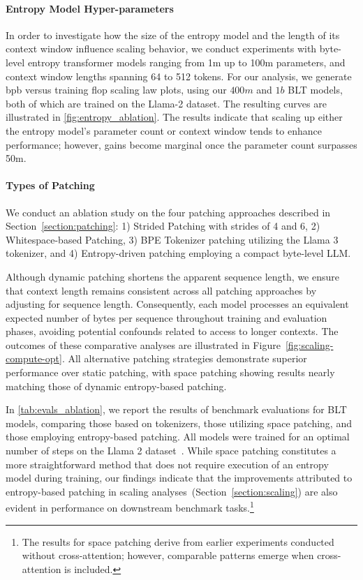 \paragraph{Entropy Model Hyper-parameters} In order to investigate how the size of the entropy model and the length of its context window influence scaling behavior, we conduct experiments with byte-level entropy transformer models ranging from 1m up to 100m parameters, and context window lengths spanning 64 to 512 tokens. For our analysis, we generate bpb versus training flop scaling law plots, using our $400m$ and $1b$ {\textsc BLT} models, both of which are trained on the Llama-2 dataset. The resulting curves are illustrated in \autoref{fig:entropy_ablation}. The results indicate that scaling up either the entropy model’s parameter count or context window tends to enhance performance; however, gains become marginal once the parameter count surpasses 50m.

\paragraph{Types of Patching}

We conduct an ablation study on the four patching approaches described in Section~\ref{section:patching}: 1) Strided Patching with strides of 4 and 6, 2) Whitespace-based Patching, 3) BPE Tokenizer patching utilizing the Llama 3 tokenizer, and 4) Entropy-driven patching employing a compact byte-level LLM.

Although dynamic patching shortens the apparent sequence length, we ensure that context length remains consistent across all patching approaches by adjusting for sequence length. Consequently, each model processes an equivalent expected number of bytes per sequence throughout training and evaluation phases, avoiding potential confounds related to access to longer contexts. The outcomes of these comparative analyses are illustrated in Figure~\ref{fig:scaling-compute-opt}. All alternative patching strategies demonstrate superior performance over static patching, with space patching showing results nearly matching those of dynamic entropy-based patching.

In \autoref{tab:evals_ablation}, we report the results of benchmark evaluations for {\textsc BLT} models, comparing those based on tokenizers, those utilizing space patching, and those employing entropy-based patching. All models were trained for an optimal number of steps on the Llama 2 dataset~\citep{dubey2024llama}. While space patching constitutes a more straightforward method that does not require execution of an entropy model during training, our findings indicate that the improvements attributed to entropy-based patching in scaling analyses~(Section~\ref{section:scaling}) are also evident in performance on downstream benchmark tasks.\footnote{The results for space patching derive from earlier experiments conducted without cross-attention; however, comparable patterns emerge when cross-attention is included.}

